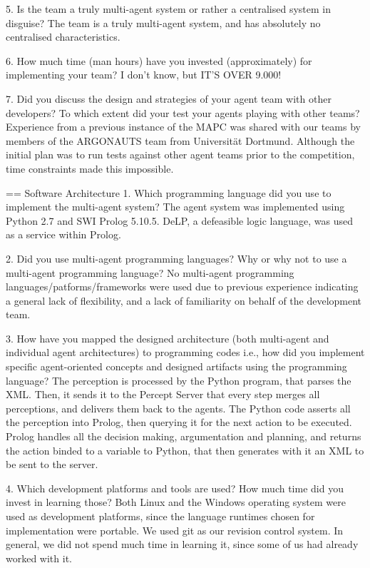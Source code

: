 5. Is the team a truly multi-agent system or rather a centralised system in
disguise?  The team is a truly multi-agent system, and has absolutely no
centralised characteristics.


6. How much time (man hours) have you invested (approximately) for
implementing your team?  I don't know, but IT'S OVER 9.000!


7. Did you discuss the design and strategies of your agent team with other
developers? To which extent did your test your agents playing with other
teams?  Experience from a previous instance of the MAPC was shared with our
teams by members of the ARGONAUTS team from Universität Dortmund. Although the
initial plan was to run tests against other agent teams prior to the
competition, time constraints made this impossible.


== Software Architecture 1. Which programming language did you use to
implement the multi-agent system?  The agent system was implemented using
Python 2.7 and SWI Prolog 5.10.5. DeLP, a defeasible logic language, was used
as a service within Prolog.

2. Did you use multi-agent programming languages? Why or why not to use a
multi-agent programming language?  No multi-agent programming
languages/patforms/frameworks were used due to previous experience indicating
a general lack of flexibility, and a lack of familiarity on behalf of the
development team.

3. How have you mapped the designed architecture (both multi-agent and
individual agent architectures) to programming codes i.e., how did you
implement specific agent-oriented concepts and designed artifacts using the
programming language?  The perception is processed by the Python program, that
parses the XML. Then, it sends it to the Percept Server that every step merges
all perceptions, and delivers them back to the agents.  The Python code
asserts all the perception into Prolog, then querying it for the next action
to be executed.  Prolog handles all the decision making, argumentation and
planning, and returns the action binded to a variable to Python, that then
generates with it an XML to be sent to the server.

4. Which development platforms and tools are used? How much time did you
invest in learning those?  Both Linux and the Windows operating system were
used as development platforms, since the language runtimes chosen for
implementation were portable.  We used git as our revision control system. In
general, we did not spend much time in learning it, since some of us had
already worked with it.

